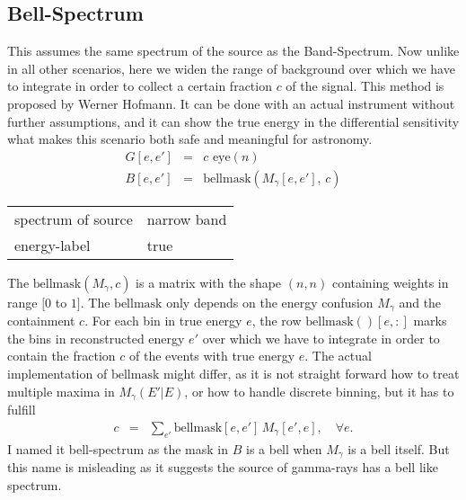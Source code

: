 \documentclass{article}%
\begin{document}
\subsection{Bell-Spectrum}
%
This assumes the same spectrum of the source as the Band-Spectrum.
%
Now unlike in all other scenarios, here we widen the range of background over which we have to integrate in order to collect a certain fraction $c$ of the signal.
%
This method is proposed by Werner Hofmann.
%
It can be done with an actual instrument without further assumptions, and it can show the true energy in the differential sensitivity what makes this scenario both safe and meaningful for astronomy.
%
\begin{eqnarray}
G[e, e'] &=& c \, \, \mathrm{eye}(n)
\\
B[e, e'] &=& \mathrm{bellmask}(M_{\gamma}[e, e'], \, c)
\end{eqnarray}
%
\begin{center}
\begin{tabular}{ll}
spectrum of source & narrow band\\
energy-label & true\\
\end{tabular}
\end{center}
%
The $\mathrm{bellmask}(M_{\gamma}, c)$ is a matrix with the shape $(n,n)$ containing weights in range $[0$ to $1]$.
%
The $\mathrm{bellmask}$ only depends on the energy confusion $M_{\gamma}$ and the containment $c$.
%
For each bin in true energy $e$, the row $\mathrm{bellmask}()[e, :]$ marks the bins in reconstructed energy $e'$ over which we have to integrate in order to contain the fraction $c$ of the events with true energy $e$.
%
The actual implementation of $\mathrm{bellmask}$ might differ, as it is not straight forward how to treat multiple maxima in $M_\gamma(E'\vert E)$, or how to handle discrete binning, but it has to fulfill
%
\begin{eqnarray}
c &=& \sum_{e'} \mathrm{bellmask}[e ,e'] \, M_{\gamma}[e', e], \,\,\,\,\,\, \forall e.
\end{eqnarray}
%
I named it bell-spectrum as the mask in $B$ is a bell when $M_\gamma$ is a bell itself. But this name is misleading as it suggests the source of gamma-rays has a bell like spectrum.
%
%
%
\end{document}
